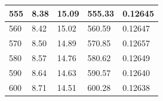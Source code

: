 \documentclass[twocolumn,english]{IEEEtran}
\theoremstyle{plain}
\theoremstyle{plain}
\begin{document}
\begin{table}[htpb]
\begin{tabular}{|l|l|l|l|l|}
555                                                                                              & 8.38                                                                                & 15.09                                                                                & 555.33                                                                                               & 0.12645                              \\ \hline
560                                                                                              & 8.42                                                                                & 15.02                                                                                & 560.59                                                                                               & 0.12647                              \\ \hline
570                                                                                              & 8.50                                                                                & 14.89                                                                                & 570.85                                                                                               & 0.12657                              \\ \hline
580                                                                                              & 8.57                                                                                & 14.76                                                                                & 580.62                                                                                               & 0.12649                              \\ \hline
590                                                                                              & 8.64                                                                                & 14.63                                                                                & 590.57                                                                                               & 0.12640                              \\ \hline
600                                                                                              & 8.71                                                                                & 14.51                                                                                & 600.28                                                                                               & 0.12638                              \\ \hline

\end{tabular}
\end{table}
\end{document}
